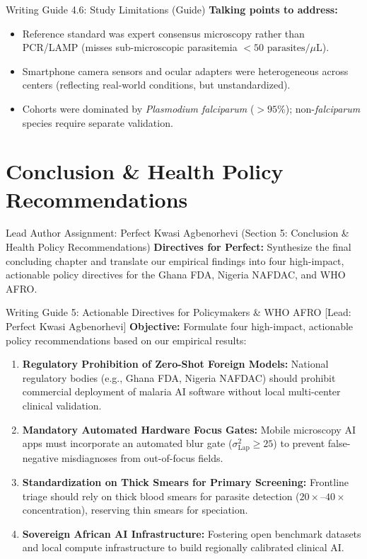 \documentclass[a4paper,11pt]{article}
\begin{document}
\begin{guidebox}{Writing Guide 4.6: Study Limitations (Guide)}
\textbf{Talking points to address:}
\begin{itemize}\itemsep1.5pt
    \item Reference standard was expert consensus microscopy rather than PCR/LAMP (misses sub-microscopic parasitemia $<50\text{ parasites}/\mu\text{L}$).
    \item Smartphone camera sensors and ocular adapters were heterogeneous across centers (reflecting real-world conditions, but unstandardized).
    \item Cohorts were dominated by \textit{Plasmodium falciparum} ($>95\%$); non-\textit{falciparum} species require separate validation.
\end{itemize}
\end{guidebox}

\section{Conclusion \& Health Policy Recommendations}
\label{sec:conclusion}

\begin{guidebox}{Lead Author Assignment: Perfect Kwasi Agbenorhevi (Section 5: Conclusion \& Health Policy Recommendations)}
\textbf{Directives for Perfect:} Synthesize the final concluding chapter and translate our empirical findings into four high-impact, actionable policy directives for the Ghana FDA, Nigeria NAFDAC, and WHO AFRO.
\end{guidebox}

\vspace{0.4em}

\begin{promptbox}{Writing Guide 5: Actionable Directives for Policymakers \& WHO AFRO [Lead: Perfect Kwasi Agbenorhevi]}
\textbf{Objective:} Formulate four high-impact, actionable policy recommendations based on our empirical results:
\begin{enumerate}\itemsep2pt
    \item \textbf{Regulatory Prohibition of Zero-Shot Foreign Models:} National regulatory bodies (e.g., Ghana FDA, Nigeria NAFDAC) should prohibit commercial deployment of malaria AI software without local multi-center clinical validation.
    \item \textbf{Mandatory Automated Hardware Focus Gates:} Mobile microscopy AI apps must incorporate an automated blur gate ($\sigma^2_{\text{Lap}} \ge 25$) to prevent false-negative misdiagnoses from out-of-focus fields.
    \item \textbf{Standardization on Thick Smears for Primary Screening:} Frontline triage should rely on thick blood smears for parasite detection ($20\times\text{--}40\times$ concentration), reserving thin smears for speciation.
    \item \textbf{Sovereign African AI Infrastructure:} Fostering open benchmark datasets and local compute infrastructure to build regionally calibrated clinical AI.
\end{enumerate}
\end{promptbox}
\end{document}
